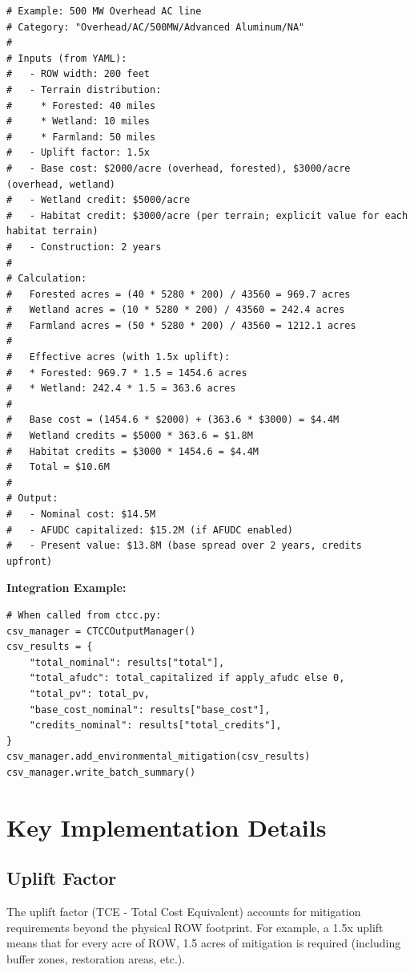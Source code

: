 \documentclass[ctcc_full_documentation.tex]{subfiles}
\begin{document}
\begin{lstlisting}
# Example: 500 MW Overhead AC line
# Category: "Overhead/AC/500MW/Advanced Aluminum/NA"
# 
# Inputs (from YAML):
#   - ROW width: 200 feet
#   - Terrain distribution:
#     * Forested: 40 miles
#     * Wetland: 10 miles
#     * Farmland: 50 miles
#   - Uplift factor: 1.5x
#   - Base cost: $2000/acre (overhead, forested), $3000/acre (overhead, wetland)
#   - Wetland credit: $5000/acre
#   - Habitat credit: $3000/acre (per terrain; explicit value for each habitat terrain)
#   - Construction: 2 years
#
# Calculation:
#   Forested acres = (40 * 5280 * 200) / 43560 = 969.7 acres
#   Wetland acres = (10 * 5280 * 200) / 43560 = 242.4 acres
#   Farmland acres = (50 * 5280 * 200) / 43560 = 1212.1 acres
#
#   Effective acres (with 1.5x uplift):
#   * Forested: 969.7 * 1.5 = 1454.6 acres
#   * Wetland: 242.4 * 1.5 = 363.6 acres
#
#   Base cost = (1454.6 * $2000) + (363.6 * $3000) = $4.4M
#   Wetland credits = $5000 * 363.6 = $1.8M
#   Habitat credits = $3000 * 1454.6 = $4.4M
#   Total = $10.6M
#
# Output:
#   - Nominal cost: $14.5M
#   - AFUDC capitalized: $15.2M (if AFUDC enabled)
#   - Present value: $13.8M (base spread over 2 years, credits upfront)
\end{lstlisting}

\textbf{Integration Example:}

\begin{lstlisting}
# When called from ctcc.py:
csv_manager = CTCCOutputManager()
csv_results = {
    "total_nominal": results["total"],
    "total_afudc": total_capitalized if apply_afudc else 0,
    "total_pv": total_pv,
    "base_cost_nominal": results["base_cost"],
    "credits_nominal": results["total_credits"],
}
csv_manager.add_environmental_mitigation(csv_results)
csv_manager.write_batch_summary()
\end{lstlisting}

\section{Key Implementation Details}

\subsection{Uplift Factor}

The uplift factor (TCE - Total Cost Equivalent) accounts for mitigation requirements beyond the physical ROW footprint. For example, a 1.5x uplift means that for every acre of ROW, 1.5 acres of mitigation is required (including buffer zones, restoration areas, etc.).
\end{document}
